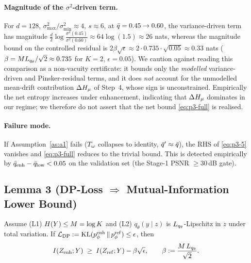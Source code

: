 \paragraph{Magnitude of the $\sigma^2$-driven term.}
For $d=128$, $\sigma_{\max}^2/\sigma_{\min}^2\approx 4$, $s\approx 6$, at $\bar{q}=0.45\to 0.60$,
the variance-driven term has magnitude
$\tfrac{d}{2}\log\tfrac{\sigma^2(0.45)}{\sigma^2(0.60)} \approx 64\log(1.5) \approx 26$ nats,
whereas the magnitude bound on the controlled residual is
$2\beta\sqrt{\epsilon}\approx 2\cdot0.735\cdot\sqrt{0.05}\approx 0.33$ nats
($\beta=ML_{q_\theta}/\sqrt{2}\approx 0.735$ for $K=2$, $\epsilon=0.05$).
We caution against reading this comparison as a non-vacuity certificate: it bounds only the
\emph{modelled} variance-driven and Pinsker-residual terms, and it does \emph{not} account
for the unmodelled mean-drift contribution $\Delta H_\mu$ of Step~4, whose sign is
unconstrained. Empirically the net entropy increases under enhancement, indicating that
$\Delta H_\mu$ dominates in our regime; we therefore do not assert that the net bound
\eqref{eq:p3-full} is realised.

\paragraph{Failure mode.}
If Assumption~\ref{as:a1} fails ($T_\omega$ collapses to identity, $\bar{q}'\approx\bar{q}$), the
RHS of \eqref{eq:p3-5} vanishes and \eqref{eq:p3-full} reduces to the trivial bound. This is
detected empirically by $\bar{q}_{\mathrm{enh}}-\bar{q}_{\mathrm{low}}<0.05$ on the validation set
(the Stage-1 PSNR $\geq 30$\,dB gate).

\subsection{Lemma 3 (DP-Loss $\Rightarrow$ Mutual-Information Lower Bound)}\label{app:a2-lemma3}

\begin{lemma}[restated]\label{lem:dp-full}
Assume (L1) $H(Y)\leq M=\log K$ and (L2) $q_\theta(y\mid z)$ is $L_{q_\theta}$-Lipschitz in $z$
under total variation. If $\mathcal{L}_{\mathrm{DP}} := \operatorname{KL}(p_\phi^{\mathrm{enh}}\,\|\,p_\phi^{\mathrm{ref}})\leq\epsilon$, then
\begin{equation}
I(Z_{\mathrm{enh}};Y) \;\geq\; I(Z_{\mathrm{ref}};Y) - \beta\sqrt{\epsilon},
\qquad \beta := \frac{M\,L_{q_\theta}}{\sqrt{2}}.
\label{eq:l3-full}
\end{equation}
\end{lemma}

